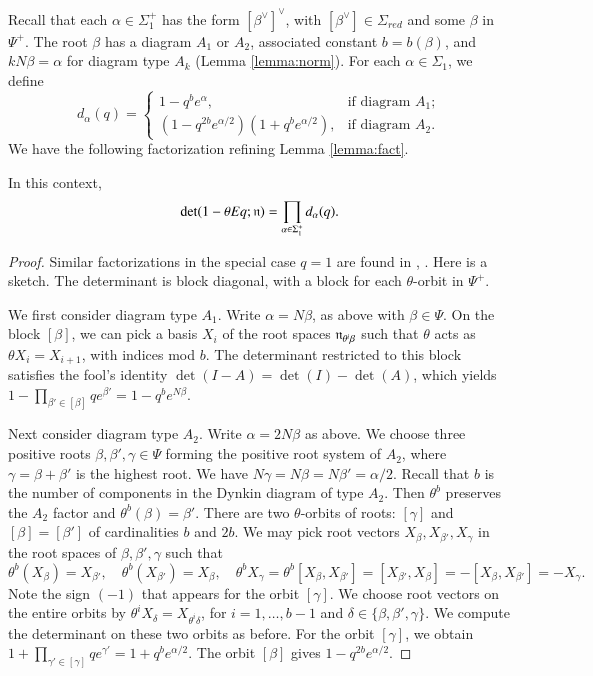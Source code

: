 Recall that each $\alpha\in \Sigma^+_1$ has the form
$[\beta^\vee]^\vee$, with $[\beta^\vee]\in \Sigma_{red}$ and some
$\beta$ in $\Psi^+$.  The root $\beta$ has a diagram $A_1$ or $A_2$,
associated constant $b=b(\beta)$, and $k N\beta = \alpha$ for diagram
type $A_k$ (Lemma \ref{lemma:norm}).  For each $\alpha\in \Sigma_1$,
we define
\begin{equation}\label{eqn:d}
d_\alpha(q) =
\begin{cases} {1-q^b e^\alpha},    &\text{if diagram } A_1;\\
{(1-q^{2b} e^{\alpha/2})(1+q^b e^{\alpha/2})},
&\text{if diagram } A_2.
\end{cases}
\end{equation}
We have the following factorization refining Lemma \ref{lemma:fact}.

\begin{lemma} \label{lemma:prod}
In this context,
\[
\det(1-\theta  E q ;{\mathfrak n}) = \prod_{\alpha\in\Sigma^+_1} d_\alpha(q).
\]
\end{lemma}

\begin{proof} Similar factorizations in the special case $q=1$ are
  found in \cite{jantzen1977darstellungen}, \cite{wendt2001weyl}.
  Here is a sketch.  The determinant is block diagonal, with a block
  for each $\theta$-orbit in $\Psi^+$.

  We first consider diagram type $A_1$.  Write $\alpha = N\beta$, as
  above with $\beta\in\Psi$.  On the block $[\beta]$, we can pick a
  basis $X_i$ of the root spaces ${\mathfrak n}_{\theta^i\beta}$ such that
  $\theta$ acts as $\theta X_i = X_{i+1}$, with indices mod $b$.  The
  determinant restricted to this block satisfies the fool's identity
  $\det(I-A) = \det(I)-\det(A)$, which yields $1- \prod_{\beta'\in
    [\beta]} {q e^{\beta'}} = 1- q^b e^{N \beta}$.

  Next consider diagram type $A_2$.  Write $\alpha = 2N\beta$ as
  above.  We choose three positive roots $\beta,\beta',\gamma\in\Psi$
  forming the positive root system of $A_2$, where
  $\gamma=\beta+\beta'$ is the highest root.  We have
  $N\gamma=N\beta=N\beta'=\alpha/2$.  Recall that $b$ is the number of
  components in the Dynkin diagram of type $A_2$.  Then $\theta^b$
  preserves the $A_2$ factor and $\theta^b(\beta)=\beta'$.  There are
  two $\theta$-orbits of roots: $[\gamma]$ and $[\beta]=[\beta']$ of
  cardinalities $b$ and $2b$.  We may pick root vectors
  $X_{\beta},X_{\beta'},X_{\gamma}$ in the root spaces of
  $\beta,\beta',\gamma$ such that
\[
\theta^b(X_\beta)= X_{\beta'},\quad \theta^b(X_{\beta'})=X_\beta,\quad
\theta^b X_\gamma = \theta^b [X_\beta,X_{\beta'}] 
= [X_{\beta'},X_\beta] = -[X_\beta,X_{\beta'}] = -X_\gamma.
\]
Note the sign $(-1)$ that appears for the orbit $[\gamma]$.  We choose
root vectors on the entire orbits by $\theta^i X_\delta=X_{\theta^i
  \delta}$, for $i=1,\ldots,b-1$ and
$\delta\in\{\beta,\beta',\gamma\}$.  We compute the determinant on
these two orbits as before.  For the orbit $[\gamma]$, we obtain
$1+\prod_{\gamma'\in [\gamma]} {q e^{\gamma'}} = 1+ q^b e^{\alpha/2}$.
The orbit $[\beta]$ gives $1-q^{2b} e^{\alpha/2}$.
\end{proof}

